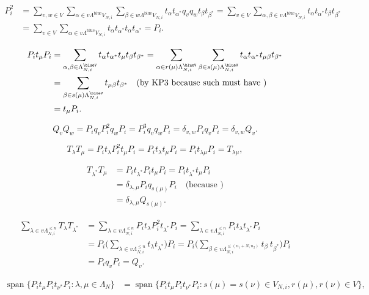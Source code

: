 \documentclass[a4paper,12pt]{article}
\begin{document}
\begin{align*}
P_i^2&=\sum_{v,w \in V}\sum_{\alpha\in v\Lambda^{{\operatorname{\mathrm{blue}}}} V_{N,i}}\sum_{\beta\in w\Lambda^{{\operatorname{\mathrm{blue}}}} V_{N,i}}t_\alpha t_{\alpha^*}q_v q_w t_\beta t_{\beta^*}
=\sum_{v \in V}\sum_{\alpha,\beta\in v\Lambda^{{\operatorname{\mathrm{blue}}}} V_{N,i}}t_\alpha t_{\alpha^*}t_\beta t_{\beta^*}\\
&=\sum_{v \in V}\sum_{\alpha\in v\Lambda^{{\operatorname{\mathrm{blue}}}} V_{N,i}}t_\alpha t_{\alpha^*}t_\alpha t_{\alpha^*}=P_i.
\end{align*}

\begin{align*}
P_it_\mu P_i&=\sum_{\alpha,\beta\in\Lambda^\blueV_{N,i}} t_\alpha t_{\alpha^*}t_\mu t_\beta t_{\beta^*}
=\sum_{\alpha\in r(\mu)\Lambda^\blueV_{N,i}}\sum_{\beta\in s(\mu)\Lambda^\blueV_{N,i}} t_\alpha t_{\alpha^*}t_{\mu \beta} t_{\beta^*}\\
&=\sum_{\beta\in s(\mu)\Lambda^\blueV_{N,i}} t_{\mu \beta} t_{\beta^*}
\quad\text{(by KP3 because such  must have )}\\
&=t_\mu P_i.
\end{align*}

\[
Q_vQ_w=P_iq_vP_i^2q_wP_i=P_i^3q_vq_wP_i=\delta_{v,w}P_iq_vP_i=\delta_{v,w}Q_v.
\]

\[
T_\lambda T_\mu=P_it_\lambda P_i^2 t_\mu P_i=P_it_\lambda t_\mu P_i=P_i t_{\lambda\mu}P_i=T_{\lambda\mu},
\]

\begin{align*}
T_{\lambda^*}T_\mu&=P_i t_{\lambda^*}P_it_\mu P_i=P_i t_{\lambda^*}t_\mu P_i\\
&=\delta_{\lambda,\mu}P_i q_{s(\mu)} P_i \quad\text{(because )}\\
&=\delta_{\lambda,\mu}Q_{s(\mu)}.
\end{align*}

\begin{align*}
\sum_{\lambda\in v\Lambda_{N,i}^{\leq n}} T_\lambda T_{\lambda^*}
&=\sum_{\lambda\in v\Lambda_{N,i}^{\leq n}} P_it_\lambda P_i^2 t_{\lambda^*}P_i=\sum_{\lambda\in v\Lambda_{N,i}^{\leq n}} P_it_\lambda  t_{\lambda^*}P_i\\
&=P_i\Big( \sum_{\lambda\in v\Lambda_{N,i}^{\leq n}} t_\lambda  t_{\lambda^*} \Big)P_i
=P_i\Big( \sum_{\beta\in v\Lambda_{N,i}^{\leq (n_1+N, n_2)}} t_\beta\ t_{\beta^*} \Big)P_i\\
&=P_iq_vP_i=Q_v.
\end{align*}

\begin{align*}{\operatorname{\mathrm{span}}}\{P_i t_\mu P_i t_{\nu^*}P_i:\lambda,\mu\in \Lambda_N\}&={\operatorname{\mathrm{span}}}\{P_i t_\mu P_i t_{\nu^*}P_i: s(\mu)=s(\nu)\in V_{N,i}, r(\mu), r(\nu)\in V\}, \end{align*}
\end{document}
